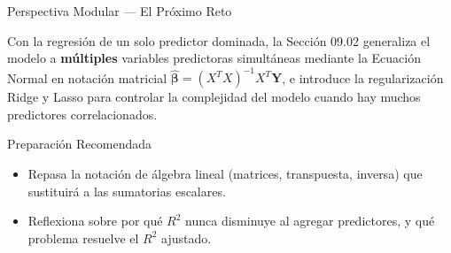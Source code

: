 \documentclass[10pt, aspectratio=169]{beamer}
\begin{document}
\begin{frame}{Perspectiva Modular --- El Próximo Reto}
  \scriptsize
  \begin{retoclase}
    Con la regresión de un solo predictor dominada, la Sección 09.02 generaliza el modelo a \textbf{múltiples} variables predictoras simultáneas mediante la Ecuación Normal en notación matricial $\hat{\boldsymbol\beta}=(X^TX)^{-1}X^T\mathbf{Y}$, e introduce la regularización Ridge y Lasso para controlar la complejidad del modelo cuando hay muchos predictores correlacionados.
  \end{retoclase}

  \vspace{0.08cm}
  \pause
  \begin{alertblock}{Preparación Recomendada}
    \begin{itemize}\itemsep=0.06cm
      \item Repasa la notación de álgebra lineal (matrices, transpuesta, inversa) que sustituirá a las sumatorias escalares.
      \item Reflexiona sobre por qué $R^2$ nunca disminuye al agregar predictores, y qué problema resuelve el $R^2$ ajustado.
    \end{itemize}
  \end{alertblock}
\end{frame}
\end{document}
